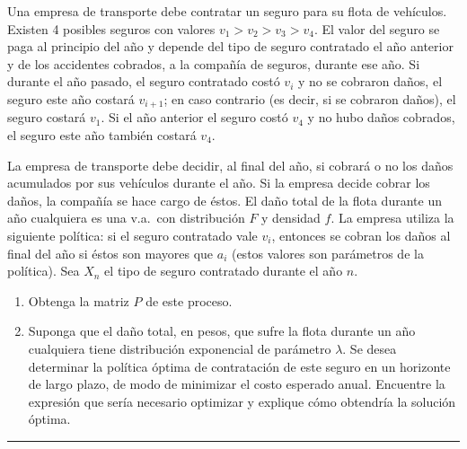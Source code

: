 \documentclass[10pt,a4paper]{article}
\newenvironment{enunciado}[1]{%
  \begin{tcolorbox}[
    breakable,
    colback=sectionbg!8, colframe=sectionbg,
    boxrule=0.8pt, arc=3pt, left=8pt, right=8pt, top=6pt, bottom=6pt,
    fonttitle=\normalsize\bfseries\sffamily, coltitle=white, colbacktitle=sectionbg, titlerule=0pt,
    title={#1},
  ]%
}{\end{tcolorbox}}
\begin{document}
\begin{enunciado}{P31 \textperiodcentered\ Empresa de transporte: seguro de flota}
  Una empresa de transporte debe contratar un seguro para su flota de veh\'iculos.
  Existen 4 posibles seguros con valores $v_1 > v_2 > v_3 > v_4$. El valor del
  seguro se paga al principio del a\~no y depende del tipo de seguro contratado el
  a\~no anterior y de los accidentes cobrados, a la compa\~n\'ia de seguros, durante
  ese a\~no. Si durante el a\~no pasado, el seguro contratado cost\'o $v_i$ y no se
  cobraron da\~nos, el seguro este a\~no costar\'a $v_{i+1}$; en caso contrario (es
  decir, si se cobraron da\~nos), el seguro costar\'a $v_1$. Si el a\~no anterior el
  seguro cost\'o $v_4$ y no hubo da\~nos cobrados, el seguro este a\~no tambi\'en
  costar\'a $v_4$.

  \smallskip
  La empresa de transporte debe decidir, al final del a\~no, si cobrar\'a o no los
  da\~nos acumulados por sus veh\'iculos durante el a\~no. Si la empresa decide cobrar
  los da\~nos, la compa\~n\'ia se hace cargo de \'estos. El da\~no total de la flota
  durante un a\~no cualquiera es una v.a.\ con distribuci\'on $F$ y densidad $f$.
  La empresa utiliza la siguiente pol\'itica: si el seguro contratado vale $v_i$,
  entonces se cobran los da\~nos al final del a\~no si \'estos son mayores que $a_i$
  (estos valores son par\'ametros de la pol\'itica). Sea $X_n$ el tipo de seguro
  contratado durante el a\~no $n$.

  \begin{enumerate}[label=\alph*)]
    \item Obtenga la matriz $P$ de este proceso.
    \item Suponga que el da\~no total, en pesos, que sufre la flota durante un a\~no
          cualquiera tiene distribuci\'on exponencial de par\'ametro $\lambda$. Se
          desea determinar la pol\'itica \'optima de contrataci\'on de este seguro en
          un horizonte de largo plazo, de modo de minimizar el costo esperado anual.
          Encuentre la expresi\'on que ser\'ia necesario optimizar y explique c\'omo
          obtendr\'ia la soluci\'on \'optima.
  \end{enumerate}
\end{enunciado}

\vspace{10pt}
{\color{subsecbg!60}\hrule}
\vspace{6pt}
\end{document}
